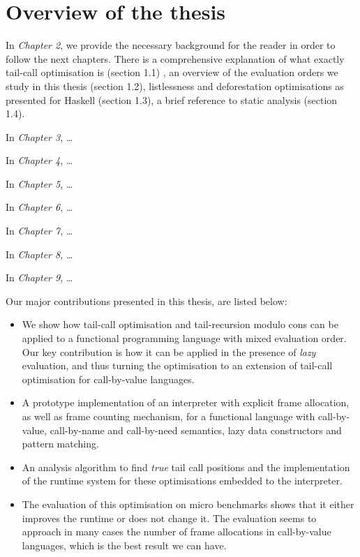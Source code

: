 \documentclass[diploma]{softlab-thesis}
\begin{document}
\section {Overview of the thesis}
In \textit{Chapter 2}, we provide the necessary background for the reader in order to follow the next chapters. 
There is a comprehensive explanation of what exactly tail-call 
optimisation is (section 1.1) , an overview of the evaluation orders we study in this thesis (section 1.2),
listlessness and deforestation optimisations as presented for Haskell (section 1.3), a brief reference to 
static analysis (section 1.4).

In \textit{Chapter 3}, \dots

In \textit{Chapter 4}, \dots

In \textit{Chapter 5}, \dots

In \textit{Chapter 6}, \dots

In \textit{Chapter 7}, \dots

In \textit{Chapter 8}, \dots

In \textit{Chapter 9}, \dots
\newline
\par Our major contributions presented in this thesis, are listed below:
\begin{itemize}
  \item We show how tail-call optimisation and tail-recursion modulo cons can be applied to a functional programming 
  language with mixed evaluation order. Our key contribution is how it can be applied in 
  the presence of \textit{lazy} evaluation, and thus turning the optimisation to an extension of tail-call optimisation 
  for call-by-value languages.
  \item A prototype implementation of an interpreter with explicit frame allocation, as well as frame counting mechanism,
  for a functional language with call-by-value, call-by-name and call-by-need semantics, lazy data constructors 
  and pattern matching.
  \item An analysis algorithm to find \textit{true} tail call positions and the implementation of the runtime system 
  for these optimisations embedded to the interpreter.
  \item The evaluation of this optimisation on micro benchmarks shows that it either improves the runtime 
  or does not change it. The evaluation seems to approach in many cases the number of frame allocations in call-by-value languages, 
  which is the best result we can have.
\end{itemize}
\end{document}
